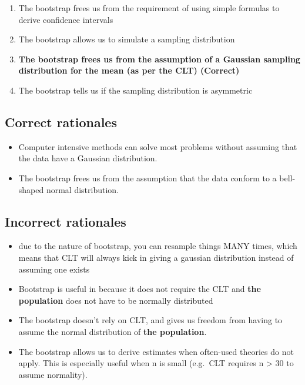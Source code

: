 \documentclass[letterpaper,9pt,twoside,printwatermark=false]{pinp}
\providecommand{\tightlist}{%
  \setlength{\itemsep}{0pt}\setlength{\parskip}{0pt}}
\begin{document}
\begin{enumerate}
\def\labelenumi{\alph{enumi}.}
\tightlist
\item
  The bootstrap frees us from the requirement of using simple formulas
  to derive confidence intervals
\item
  The bootstrap allows us to simulate a sampling distribution
\item
  \textbf{The bootstrap frees us from the assumption of a Gaussian
  sampling distribution for the mean (as per the CLT) (Correct)}
\item
  The bootstrap tells us if the sampling distribution is asymmetric
\end{enumerate}

\hypertarget{correct-rationales-6}{%
\subsection{Correct rationales}\label{correct-rationales-6}}

\begin{itemize}
\tightlist
\item
  Computer intensive methods can solve most problems without assuming
  that the data have a Gaussian distribution.
\item
  The bootstrap frees us from the assumption that the data conform to a
  bell-shaped normal distribution.
\end{itemize}

\hypertarget{incorrect-rationales-6}{%
\subsection{Incorrect rationales}\label{incorrect-rationales-6}}

\begin{itemize}
\tightlist
\item
  due to the nature of bootstrap, you can resample things MANY times,
  which means that CLT will always kick in giving a gaussian
  distribution instead of assuming one exists
\item
  Bootstrap is useful in because it does not require the CLT and
  \textbf{the population} does not have to be normally distributed
\item
  The bootstrap doesn't rely on CLT, and gives us freedom from having to
  assume the normal distribution of \textbf{the population}.
\item
  The bootstrap allows us to derive estimates when often-used theories
  do not apply. This is especially useful when n is small (e.g.~CLT
  requires n \textgreater{} 30 to assume normality).
\end{itemize}
\end{document}
